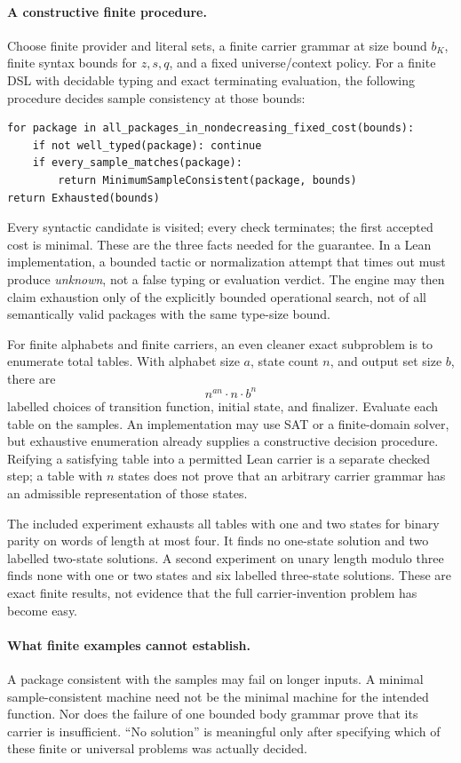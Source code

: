 \documentclass[11pt,a4paper]{article}
\theoremstyle{definition}
\theoremstyle{remark}
\begin{document}
\paragraph{A constructive finite procedure.}
Choose finite provider and literal sets, a finite carrier grammar at size bound
$b_K$, finite syntax bounds for $z,s,q$, and a fixed universe/context policy.
For a finite DSL with decidable typing and exact terminating evaluation, the
following procedure decides sample consistency at those bounds:
\begin{lstlisting}
for package in all_packages_in_nondecreasing_fixed_cost(bounds):
    if not well_typed(package): continue
    if every_sample_matches(package):
        return MinimumSampleConsistent(package, bounds)
return Exhausted(bounds)
\end{lstlisting}
Every syntactic candidate is visited; every check terminates; the first accepted
cost is minimal. These are the three facts needed for the guarantee. In a Lean
implementation, a bounded tactic or normalization attempt that times out must
produce \emph{unknown}, not a false typing or evaluation verdict. The engine
may then claim exhaustion only of the explicitly bounded operational search,
not of all semantically valid packages with the same type-size bound.

For finite alphabets and finite carriers, an even cleaner exact subproblem is
to enumerate total tables. With alphabet size $a$, state count $n$, and output
set size $b$, there are
\[
 n^{an}\cdot n\cdot b^n
\]
labelled choices of transition function, initial state, and finalizer. Evaluate
each table on the samples. An implementation may use SAT or a finite-domain
solver, but exhaustive enumeration already supplies a constructive decision
procedure. Reifying a satisfying table into a permitted Lean carrier is a
separate checked step; a table with $n$ states does not prove that an arbitrary
carrier grammar has an admissible representation of those states.

The included experiment exhausts all tables with one and two states for binary
parity on words of length at most four. It finds no one-state solution and two
labelled two-state solutions. A second experiment on unary length modulo three
finds none with one or two states and six labelled three-state solutions. These
are exact finite results, not evidence that the full carrier-invention problem
has become easy.

\paragraph{What finite examples cannot establish.}
A package consistent with the samples may fail on longer inputs. A minimal
sample-consistent machine need not be the minimal machine for the intended
function. Nor does the failure of one bounded body grammar prove that its
carrier is insufficient. ``No solution'' is meaningful only after specifying
which of these finite or universal problems was actually decided.
\end{document}
